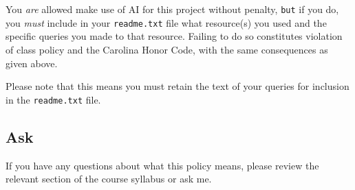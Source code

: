 \documentclass[11pt]{article}
\renewcommand{\t}[1]{\texttt{#1}}
\theoremstyle{definition}
\begin{document}
You \emph{are} allowed make use of AI for this project without penalty, \t{but} if you do, you \emph{must} include in your \t{readme.txt} file what resource(s) you used and the specific queries you made to that resource.  Failing to do so constitutes violation of class policy and the Carolina Honor Code, with the same consequences as given above.

Please note that this means you must retain the text of your queries for inclusion in the \t{readme.txt} file.

\subsection{Ask}

If you have any questions about what this policy means, please review the relevant section of the course syllabus or ask me.
\end{document}
